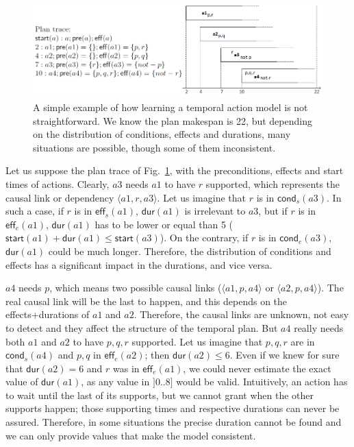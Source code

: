 \documentclass[runningheads]{llncs}
\newcommand{\tup}[1]{{\langle #1 \rangle}}
\newcommand{\pre}{\mathsf{pre}}    %
\newcommand{\eff}{\mathsf{eff}}    %
\newcommand{\cond}{\mathsf{cond}}  %
\newcommand{\dur}{\mathsf{dur}}    %
\newcommand{\start}{\mathsf{start}}%
\begin{document}
\begin{figure}


\center \includegraphics[width=12cm]{ejemploacciones2.png}
\caption{A simple example of how learning a temporal action model is not straightforward. We know the plan makespan is 22, but depending on the distribution of conditions, effects and durations, many situations are possible, though some of them inconsistent.}
\label{fig:exampleplantrace}
\end{figure}


Let us suppose the plan trace of Fig.~\ref{fig:exampleplantrace}, with the preconditions, effects and start times of actions. Clearly, $a3$ needs $a1$ to have $r$ supported, which represents the causal link or dependency $\tup{a1,r,a3}$. Let us imagine that $r$ is in $\cond_s(a3)$. In such a case, if $r$ is in $\eff_s(a1)$, $\dur(a1)$ is irrelevant to $a3$, but if $r$ is in $\eff_e(a1)$, $\dur(a1)$ has to be lower or equal than 5 ($\start(a1)+\dur(a1) \leq \start(a3)$). On the contrary, if $r$ is in $\cond_e(a3)$, $\dur(a1)$ could be much longer. Therefore, the distribution of conditions and effects has a significant impact in the durations, and vice versa.

$a4$ needs $p$, which means two possible causal links ($\tup{a1,p,a4}$ or $\tup{a2,p,a4}$). The real causal link will be the last to happen, and this depends on the effects+durations of $a1$ and $a2$. Therefore, the causal links are unknown, not easy to detect and they affect the structure of the temporal plan. But $a4$ really needs both $a1$ and $a2$ to have $p,q,r$ supported. Let us imagine that $p,q,r$ are in $\cond_s(a4)$ and $p,q$ in $\eff_e(a2)$; then $\dur(a2) \leq 6$. Even if we knew for sure that $\dur(a2)=6$ and $r$ was in $\eff_e(a1)$, we could never estimate the exact value of $\dur(a1)$, as any value in $]0..8]$ would be valid. Intuitively, an action has to wait until the last of its supports, but we cannot grant when the other supports happen; those supporting times and respective durations can never be assured. Therefore, in some situations the precise duration cannot be found and we can only provide values that make the model consistent.
\end{document}
